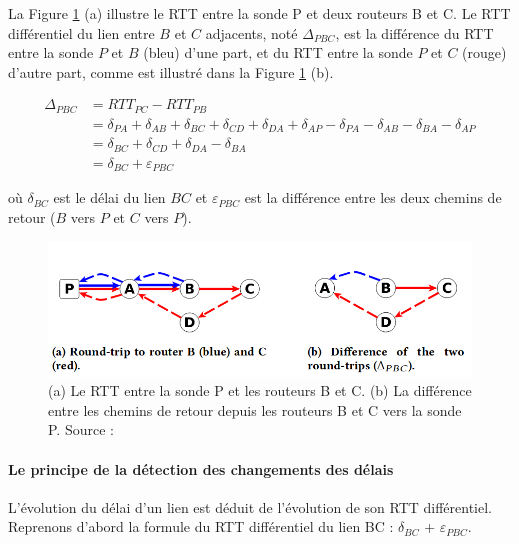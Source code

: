 La Figure 	\ref{fig:rtt-differ} (a)  illustre le RTT entre la sonde P et deux routeurs B et C. Le RTT différentiel  du lien entre  $B$ et $C$ adjacents, noté $\Delta_{PBC}$, est la différence du RTT entre la sonde $P$ et $B$ (bleu) d'une part, et du RTT entre la sonde $P$ et $C$  (rouge) d'autre part, comme est  illustré dans la Figure	\ref{fig:rtt-differ} (b). 

\begin{align*}
\Delta_{PBC} &= RTT_{PC} - RTT_{PB} \\
&= \delta_{PA} + \delta_{AB} + \delta_{BC} + \delta_{CD} + \delta_{DA}+ \delta_{AP} - \delta_{PA} - \delta_{AB}- \delta_{BA} - \delta_{AP} \\
&=  \delta_{BC} + \delta_{CD} + \delta_{DA}- \delta_{BA} \\
&= \delta_{BC} + \varepsilon_{PBC}
\end{align*}

où $\delta_{BC}$ est le délai du lien $BC$ et $\varepsilon_{PBC}$ est la différence entre les deux chemins de retour ($B$ vers $P$ et $C$ vers $P$). 
\begin{figure}[H]
	\centering
		\captionsetup{justification= centering}
	\includegraphics[width=0.7\linewidth]{illustrations/rtt-differ}
	\caption{(a) Le RTT entre la sonde P et les routeurs B et C. (b) La différence entre les  chemins de retour depuis les routeurs B et C vers la sonde P. Source : \cite{DBLP:journals/corr/FontugneAPB16}}
	\label{fig:rtt-differ}
\end{figure}

\paragraph{Le principe de la détection des changements des délais}

L'évolution du délai d'un lien est déduit de l'évolution de son RTT différentiel. Reprenons d'abord la formule du RTT différentiel du lien BC :   $\delta_{BC}$ + $\varepsilon_{PBC}$. 
 
